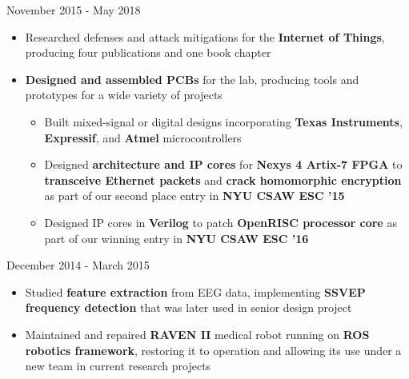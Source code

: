 \documentclass{my_resume}
\begin{document}
    {November 2015 - May 2018}
\begin{flushleft}
\begin{itemize}[noitemsep]
  \item Researched defenses and attack mitigations for the \textbf{Internet of Things}, producing four publications and one book chapter
  \item \textbf{Designed and assembled PCBs} for the lab, producing tools and prototypes for a wide variety of projects
  \begin{itemize}[noitemsep]
    \item Built mixed-signal or digital designs incorporating \textbf{Texas Instruments}, \textbf{Expressif}, and \textbf{Atmel} microcontrollers
    \item Designed \textbf{architecture and IP cores} for \textbf{Nexys 4 Artix-7 FPGA} to \textbf{transceive Ethernet packets} and \textbf{crack homomorphic encryption} as part of our second place entry in \textbf{NYU CSAW ESC '15}
    \item Designed IP cores in \textbf{Verilog} to patch \textbf{OpenRISC processor core} as part of our winning entry in \textbf{NYU CSAW ESC '16}
  \end{itemize}
\end{itemize}
\end{flushleft}
	{December 2014 - March 2015}
\begin{flushleft}
\begin{itemize}[noitemsep]
  \item Studied \textbf{feature extraction} from EEG data, implementing \textbf{SSVEP frequency detection} that was later used in senior design project
  \item Maintained and repaired \textbf{RAVEN II} medical robot running on \textbf{ROS robotics framework}, restoring it to operation and allowing its use under a new team in current research projects
\end{itemize}
\end{flushleft}
\end{document}
